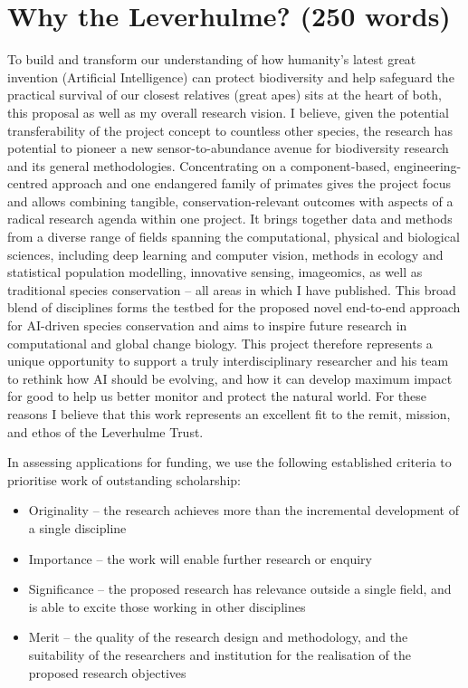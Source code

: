 \documentclass{article}
\newcommand{\tb}[1]{\textcolor[rgb]{0,0,0.5}{#1}}
\begin{document}
\newpage

\section*{\tb{Why the Leverhulme? (250 words)}}
\tb{To build and transform our understanding of how humanity’s latest great invention (Artificial Intelligence) can protect biodiversity and help safeguard the practical survival of our closest relatives (great apes) sits at the heart of both, this proposal as well as my overall research vision. I believe, given the potential transferability of the project concept to countless other species, the research has potential to pioneer a new sensor-to-abundance avenue for biodiversity research and its general methodologies. Concentrating on a component-based, engineering-centred approach and one endangered family of primates gives the project focus and allows combining tangible, conservation-relevant outcomes with aspects of a radical research agenda within one project. It brings together data and methods from a diverse range of fields spanning the computational, physical and biological sciences, including deep learning and computer vision, methods in ecology and statistical population modelling, innovative sensing, imageomics, as well as traditional species conservation – all areas in which I have published. This broad blend of disciplines forms the testbed for the proposed novel end-to-end approach for AI-driven species conservation and aims to inspire future research in computational and global change biology. This project therefore represents a unique opportunity to support a truly interdisciplinary researcher and his team to rethink how AI should be evolving, and how it can develop maximum impact for good to help us better monitor and protect the natural world. For these reasons I believe that this work represents an excellent fit to the remit, mission, and ethos of the Leverhulme Trust.}

In assessing applications for funding, we use the following established criteria to prioritise work of outstanding scholarship:

\begin{itemize}
    \item Originality – the research achieves more than the incremental development of a single discipline
    \item Importance – the work will enable further research or enquiry
    \item Significance – the proposed research has relevance outside a single field, and is able to excite those working in other disciplines
    \item Merit – the quality of the research design and methodology, and the suitability of the researchers and institution for the realisation of the proposed research objectives
\end{itemize}
\end{document}

